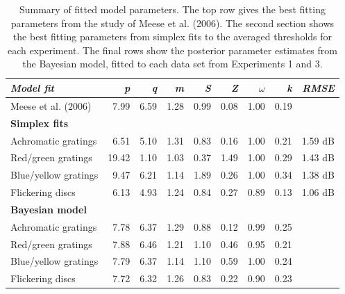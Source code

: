 \documentclass[
  letterpaper,
  DIV=11,
  numbers=noendperiod]{scrartcl}
\begin{document}
\hypertarget{tbl-parametertable}{}
\begin{table}
\caption{\label{tbl-parametertable}Summary of fitted model parameters. The top row gives the best fitting
parameters from the study of Meese et al. (2006). The second section
shows the best fitting parameters from simplex fits to the averaged
thresholds for each experiment. The final rows show the posterior
parameter estimates from the Bayesian model, fitted to each data set
from Experiments 1 and 3. }\tabularnewline

\centering
\begin{tabular}{lrrrrrrrr}
\toprule
\textbf{\em{Model fit}} & \textbf{\em{p}} & \textbf{\em{q}} & \textbf{\em{m}} & \textbf{\em{S}} & \textbf{\em{Z}} & \textbf{\em{$\omega$}} & \textbf{\em{k}} & \textbf{\em{RMSE}}\\
\midrule
Meese et al. (2006) & 7.99 & 6.59 & 1.28 & 0.99 & 0.08 & 1.00 & 0.19 & \\
\midrule
\textbf{Simplex fits} & \textbf{} & \textbf{} & \textbf{} & \textbf{} & \textbf{} & \textbf{} & \textbf{} & \textbf{}\\
Achromatic gratings & 6.51 & 5.10 & 1.31 & 0.83 & 0.16 & 1.00 & 0.21 & 1.59 dB\\
Red/green gratings & 19.42 & 1.10 & 1.03 & 0.37 & 1.49 & 1.00 & 0.29 & 1.43 dB\\
Blue/yellow gratings & 9.47 & 6.21 & 1.14 & 1.89 & 0.26 & 1.00 & 0.34 & 1.38 dB\\
Flickering discs & 6.13 & 4.93 & 1.24 & 0.84 & 0.27 & 0.89 & 0.13 & 1.06 dB\\
\midrule
\textbf{Bayesian model} & \textbf{} & \textbf{} & \textbf{} & \textbf{} & \textbf{} & \textbf{} & \textbf{} & \textbf{}\\
Achromatic gratings & 7.78 & 6.37 & 1.29 & 0.88 & 0.12 & 0.99 & 0.25 & \\
Red/green gratings & 7.88 & 6.46 & 1.21 & 1.10 & 0.46 & 0.95 & 0.21 & \\
Blue/yellow gratings & 7.79 & 6.37 & 1.14 & 1.10 & 0.59 & 1.00 & 0.24 & \\
Flickering discs & 7.72 & 6.32 & 1.26 & 0.83 & 0.22 & 0.90 & 0.23 & \\
\bottomrule
\end{tabular}
\end{table}
\end{document}
